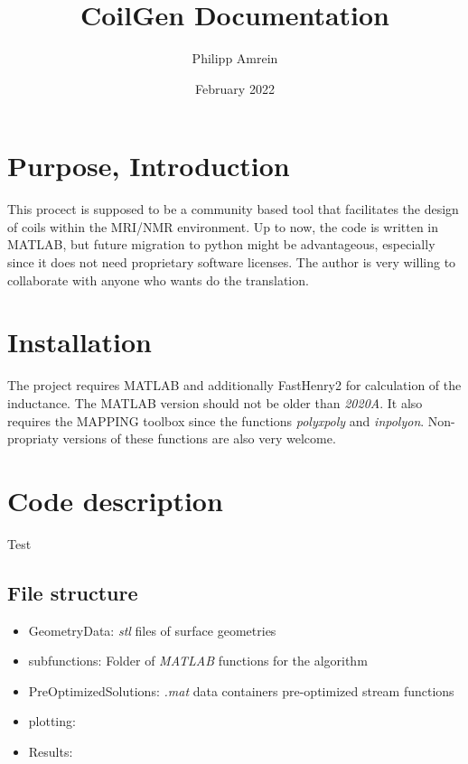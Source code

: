 \documentclass[a4paper,12pt]{book}
\begin{document}
\begin{titlepage}
\author{Philipp Amrein}
\title{CoilGen Documentation}
\date{February 2022}
\end{titlepage}


\maketitle
\tableofcontents

\newpage

\section{{Purpose, Introduction}}
This procect is supposed to be a community based tool that facilitates the design of coils within the MRI/NMR environment.
Up to now, the code is written in MATLAB, but future migration to python might be advantageous, especially since it does not need proprietary software licenses. The author is very willing to collaborate with anyone who wants do the translation.

\section{Installation}
The project requires MATLAB and additionally FastHenry2 for calculation of the inductance.  The MATLAB version should not be older than \textit{2020A}. It also requires the MAPPING toolbox since the functions \textit{polyxpoly} and \textit{inpolyon}. Non-propriaty versions of these functions are also very welcome.

\section{Code description}
Test

\subsection{File structure}

\begin{itemize}
	\item  Geometry\textunderscore Data: \textit{stl} files of surface geometries
	\item  sub\textunderscore functions: Folder of \textit{MATLAB} functions for the algorithm
	\item  Pre\textunderscore Optimized\textunderscore Solutions: \textit{.mat} data containers pre-optimized stream functions  
	\item  plotting:
	\item  Results: 
	
\end{itemize}
\end{document}
